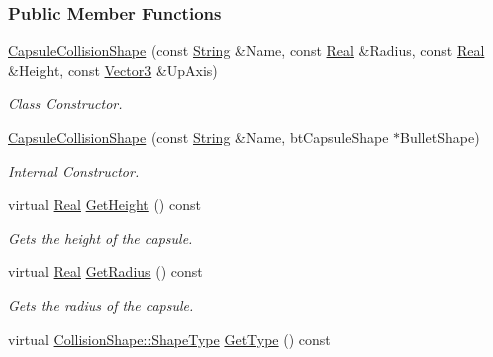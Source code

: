 \subsubsection*{Public Member Functions}
\begin{DoxyCompactItemize}
\item 
\hyperlink{classphys_1_1CapsuleCollisionShape_a60d128751f3d7302f4e56a5f400d1cff}{CapsuleCollisionShape} (const \hyperlink{namespacephys_aa03900411993de7fbfec4789bc1d392e}{String} \&Name, const \hyperlink{namespacephys_af7eb897198d265b8e868f45240230d5f}{Real} \&Radius, const \hyperlink{namespacephys_af7eb897198d265b8e868f45240230d5f}{Real} \&Height, const \hyperlink{classphys_1_1Vector3}{Vector3} \&UpAxis)
\begin{DoxyCompactList}\small\item\em Class Constructor. \item\end{DoxyCompactList}\item 
\hyperlink{classphys_1_1CapsuleCollisionShape_a663f5d5c64d5ed62181ac3519ed504bd}{CapsuleCollisionShape} (const \hyperlink{namespacephys_aa03900411993de7fbfec4789bc1d392e}{String} \&Name, btCapsuleShape $\ast$BulletShape)
\begin{DoxyCompactList}\small\item\em Internal Constructor. \item\end{DoxyCompactList}\item 
virtual \hyperlink{namespacephys_af7eb897198d265b8e868f45240230d5f}{Real} \hyperlink{classphys_1_1CapsuleCollisionShape_a59739833dc1ce78233e38becad43d620}{GetHeight} () const 
\begin{DoxyCompactList}\small\item\em Gets the height of the capsule. \item\end{DoxyCompactList}\item 
virtual \hyperlink{namespacephys_af7eb897198d265b8e868f45240230d5f}{Real} \hyperlink{classphys_1_1CapsuleCollisionShape_a0c87a9a94dae9006c71547a5c30ab87c}{GetRadius} () const 
\begin{DoxyCompactList}\small\item\em Gets the radius of the capsule. \item\end{DoxyCompactList}\item 
virtual \hyperlink{classphys_1_1CollisionShape_af3ba4fd8af5b9557f912d2f5ff35a588}{CollisionShape::ShapeType} \hyperlink{classphys_1_1CapsuleCollisionShape_a032a77623d5cf40537b7830ee2d2bb7c}{GetType} () const 

\end{DoxyCompactItemize}
